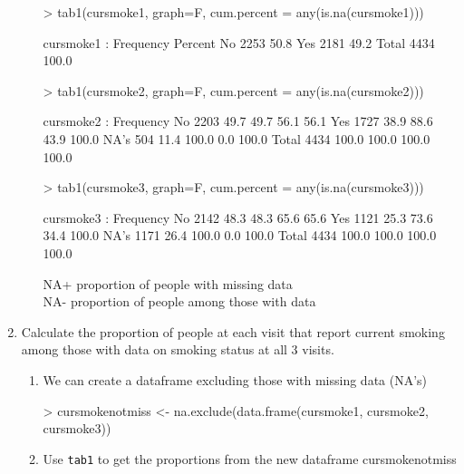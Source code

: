 \documentclass{article}
\begin{document}
\begin{enumerate}
\begin{enumerate}
\begin{Schunk}
\begin{Sinput}
> tab1(cursmoke1, graph=F, cum.percent = any(is.na(cursmoke1)))
\end{Sinput}
\begin{Soutput}
cursmoke1 : 
        Frequency Percent
No           2253    50.8
Yes          2181    49.2
  Total      4434   100.0
\end{Soutput}
\begin{Sinput}
> tab1(cursmoke2, graph=F, cum.percent = any(is.na(cursmoke2)))
\end{Sinput}
\begin{Soutput}
cursmoke2 : 
        Frequency   %(NA+) cum.%(NA+)   %(NA-) cum.%(NA-)
No           2203     49.7       49.7     56.1       56.1
Yes          1727     38.9       88.6     43.9      100.0
NA's          504     11.4      100.0      0.0      100.0
  Total      4434    100.0      100.0    100.0      100.0
\end{Soutput}
\begin{Sinput}
> tab1(cursmoke3, graph=F, cum.percent = any(is.na(cursmoke3)))
\end{Sinput}
\begin{Soutput}
cursmoke3 : 
        Frequency   %(NA+) cum.%(NA+)   %(NA-) cum.%(NA-)
No           2142     48.3       48.3     65.6       65.6
Yes          1121     25.3       73.6     34.4      100.0
NA's         1171     26.4      100.0      0.0      100.0
  Total      4434    100.0      100.0    100.0      100.0
\end{Soutput}
\end{Schunk}
NA+ proportion of people with missing data\\
NA- proportion of people among those with data
\end{enumerate}
\pagebreak
\item Calculate the proportion of people at each visit that report current smoking among those with data on smoking status at all 3 visits.
\begin{enumerate}
  \item We can create a dataframe excluding those with missing data (NA's)
\begin{Schunk}
\begin{Sinput}
> cursmokenotmiss <- na.exclude(data.frame(cursmoke1, cursmoke2, cursmoke3))
\end{Sinput}
\end{Schunk}
  \item Use \texttt{tab1} to get the proportions from the new dataframe cursmokenotmiss

\end{enumerate}
\end{enumerate}
\end{document}
